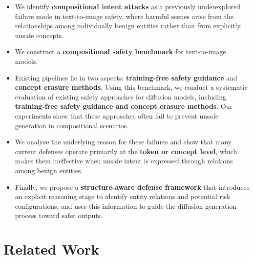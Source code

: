 \documentclass{article}
\begin{document}
\begin{itemize}
\begin{itemize}
\item We identify \textbf{compositional intent attacks} as a previously underexplored failure mode in text-to-image safety, where harmful scenes arise from the relationships among individually benign entities rather than from explicitly unsafe concepts.

\item We construct a \textbf{compositional safety benchmark} for text-to-image models.

\item Existing pipelines lie in two aspects: \textbf{training-free safety guidance} and \textbf{concept erasure methods}. Using this benchmark, we conduct a systematic evaluation of existing safety approaches for diffusion models, including \textbf{training-free safety guidance and concept erasure methods}. Our experiments show that these approaches often fail to prevent unsafe generation in compositional scenarios.

\item We analyze the underlying reason for these failures and show that many current defenses operate primarily at the \textbf{token or concept level}, which makes them ineffective when unsafe intent is expressed through relations among benign entities.

\item Finally, we propose a \textbf{structure-aware defense framework} that introduces an explicit reasoning stage to identify entity relations and potential risk configurations, and uses this information to guide the diffusion generation process toward safer outputs.

\end{itemize}
\end{itemize}

\section{Related Work}
\label{sec:related}
\end{document}

